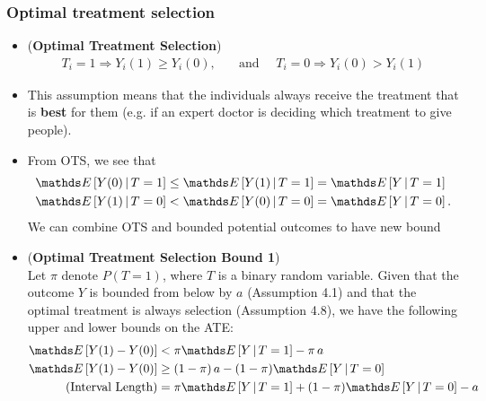 \documentclass[11pt]{article}
\begin{document}
\subsubsection{Optimal treatment selection}
\begin{itemize}
\item \begin{assumption} (\textbf{Optimal Treatment Selection}) \citep{neal2020introduction} \\
\begin{align}
T_i = 1 \Rightarrow Y_i(1) \ge Y_i(0), &\quad \text{and } \quad T_i = 0 \Rightarrow Y_i(0) > Y_i(1)  \label{eqn: ots_assumption}
\end{align}
\end{assumption}

\item This assumption means that the individuals always receive the treatment that is \textbf{best} for them (e.g. if an expert doctor is deciding which treatment to give people).

\item From OTS, we see that 
\begin{align*}
\E{}{Y(0) \,|\, T=1} &\le \E{}{Y(1) \,|\, T=1} = \E{}{Y \,|\, T=1} \\
\E{}{Y(1) \,|\, T=0} &< \E{}{Y(0) \,|\, T=0} = \E{}{Y \,|\, T=0}.
\end{align*} We can combine OTS and bounded potential outcomes to have new bound

\item \begin{proposition} (\textbf{Optimal Treatment Selection Bound 1}) \citep{neal2020introduction} \\
Let $\pi$ denote $P(T = 1)$, where $T$ is a binary random variable. Given that the outcome $Y$ is bounded from below by $a$ (Assumption 4.1) and that the optimal treatment is always selection (Assumption 4.8), we have the following upper and lower bounds on the ATE:
\begin{align}
\E{}{Y(1) - Y(0)}  &< \pi \E{}{Y \,|\, T=1} - \pi \,a \label{eqn: ots_upper_bound_1} \\
\E{}{Y(1) - Y(0)}  &\ge (1-\pi)\,a - (1-\pi) \E{}{Y \,|\, T=0}  \label{eqn: ots_lower_bound_1} \\
(\text{Interval Length}) &= \pi \E{}{Y \,|\, T=1} + (1-\pi) \E{}{Y \,|\, T=0} - a \label{eqn: ots_int_len_1}
\end{align}
\end{proposition}


\end{itemize}
\end{document}
